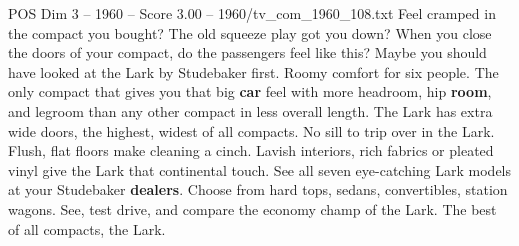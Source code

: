 \begin{textsample}{POS Dim 3 – 1960 – Score 3.00 – 1960/tv\_com\_1960\_108.txt}  \label{ex:f3_pos_027}
Feel cramped in the compact you bought?
The old squeeze play got you down?
When you close the doors of your compact, do the passengers feel like this?
Maybe you should have looked at the Lark by Studebaker first.
Roomy comfort for six people.
The only compact that gives you that big \textbf{car} feel with more headroom, hip \textbf{room}, and legroom than any other compact in less overall length.
The Lark has extra wide doors, the highest, widest of all compacts.
No sill to trip over in the Lark.
Flush, flat floors make cleaning a cinch.
Lavish interiors, rich fabrics or pleated vinyl give the Lark that continental touch.
See all seven eye-catching Lark models at your Studebaker \textbf{dealers}.
Choose from hard tops, sedans, convertibles, station wagons.
See, test drive, and compare the economy champ of the Lark.
The best of all compacts, the Lark.

\end{textsample}
